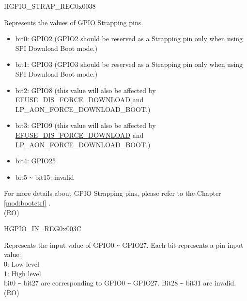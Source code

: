 \begin{register}{H}{GPIO\_STRAP\_REG}{0x0038}\label{regdesc:GPIOSTRAPREG}
%
%
\regnewline%
\begin{regdesc}\begin{reglist}
\label{fielddesc:GPIOSTRAPPING}\item [GPIO\_STRAPPING] Represents the values of GPIO Strapping pins.
\begin{itemize}
    \item bit0: GPIO2 (GPIO2 should be reserved as a Strapping pin only when using SPI Download Boot mode.)
    \item bit1: GPIO3 (GPIO3 should be reserved as a Strapping pin only when using SPI Download Boot mode.)
    \item bit2: GPIO8 (this value will also be affected by  \hyperref[fielddesc:EFUSEDISFORCEDOWNLOAD]{EFUSE\_DIS\_FORCE\_DOWNLOAD}  and LP\_AON\_FORCE\_DOWNLOAD\_BOOT.)
    \item bit3: GPIO9 (this value will also be affected by  \hyperref[fielddesc:EFUSEDISFORCEDOWNLOAD]{EFUSE\_DIS\_FORCE\_DOWNLOAD}  and LP\_AON\_FORCE\_DOWNLOAD\_BOOT.)
    \item bit4: GPIO25
    \item bit5 \verb+~+ bit15: invalid
\end{itemize}
For more details about GPIO Strapping pins, please refer to the Chapter \ref{mod:bootctrl} \textit{}. \\
(RO)


\end{reglist}\end{regdesc}
\end{register}


\begin{register}{H}{GPIO\_IN\_REG}{0x003C}\label{regdesc:GPIOINREG}
%
\regnewline%
\begin{regdesc}\begin{reglist}
\label{fielddesc:GPIOINDATANEXT}\item [GPIO\_IN\_DATA\_NEXT] Represents the input value of GPIO0 \verb+~+ GPIO27. Each bit represents a pin input value:\\
0: Low level\\
1: High level\\
bit0 \verb+~+ bit27 are corresponding to GPIO0 \verb+~+ GPIO27. Bit28 \verb+~+ bit31 are invalid.\\
(RO)
\end{reglist}\end{regdesc}
\end{register}

